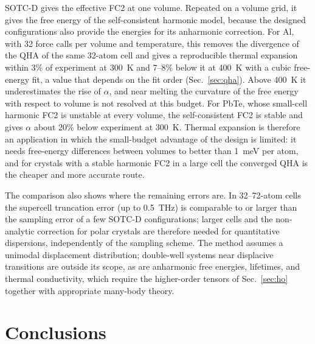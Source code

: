 \documentclass[aip,jap,reprint,amsmath,amssymb,floatfix]{revtex4-2}
\begin{document}
SOTC-D gives the effective FC2 at one volume. Repeated on a volume grid, it
gives the free energy of the self-consistent harmonic model, because the
designed configurations also provide the energies for its anharmonic
correction. For Al, with 32 force calls per volume and temperature, this
removes the divergence of the QHA of the same 32-atom cell and gives a
reproducible thermal expansion within 3\% of experiment at 300~K and
7--8\% below it at 400~K with a cubic free-energy fit, a value that
depends on the fit order (Sec.~\ref{sec:qha}). Above 400~K it underestimates the rise of $\alpha$, and
near melting the curvature of the free energy with respect to volume is not
resolved at this budget. For PbTe, whose small-cell harmonic FC2 is
unstable at every volume, the self-consistent FC2 is stable and gives
$\alpha$ about 20\% below experiment at 300~K. Thermal expansion is therefore an application in
which the small-budget advantage of the design is limited: it needs
free-energy differences between volumes to better than 1~meV per atom, and
for crystals with a stable harmonic FC2 in a large cell the converged QHA
is the cheaper and more accurate route.

The comparison also shows where the remaining errors are. In 32--72-atom cells
the supercell truncation error (up to 0.5~THz) is comparable to or larger than
the sampling error of a few SOTC-D configurations; larger cells and the
non-analytic correction for polar crystals are therefore needed for
quantitative dispersions, independently of the sampling scheme. The method
assumes a unimodal displacement distribution; double-well systems near
displacive transitions are outside its scope, as are anharmonic free
energies, lifetimes, and thermal conductivity, which require the
higher-order tensors of Sec.~\ref{sec:ho} together with appropriate
many-body theory.

\section{Conclusions}\label{sec:conclusions}
\end{document}
